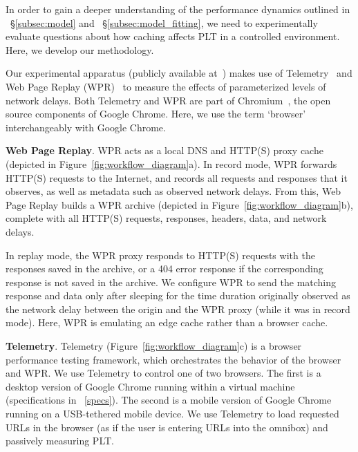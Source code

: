 \label{setup}
In order to gain a deeper understanding of the performance dynamics outlined in ~\S\ref{subsec:model} and ~\S\ref{subsec:model_fitting}, we need to experimentally evaluate questions about how caching affects PLT in a controlled environment.
Here, we develop our methodology.

Our experimental apparatus (publicly available at~\cite{jamshed-telemetry}) makes use of Telemetry~\cite{telemetry} and Web Page Replay (WPR)~\cite{wpr} to measure the effects of parameterized levels of network delays.
Both Telemetry and WPR are part of Chromium~\cite{chromium-source}, the open source components of Google Chrome.
Here, we use the term `browser' interchangeably with Google Chrome.

\textbf{Web Page Replay}. WPR acts as a local DNS and HTTP(S) proxy cache (depicted in Figure~\ref{fig:workflow_diagram}a).
In record mode, WPR forwards HTTP(S) requests to the Internet, and records all requests and responses that it observes, as well as metadata such as observed network delays. From this, Web Page Replay builds a WPR archive (depicted in Figure~\ref{fig:workflow_diagram}b), complete with all HTTP(S) requests, responses, headers, data, and network delays. %

In replay mode, the WPR proxy responds to HTTP(S) requests with the responses saved in the archive, or a 404 error response if the corresponding response is not saved in the archive.
We configure WPR to send the matching response and data only after sleeping for the time duration originally observed as the network delay between the origin and the WPR proxy (while it was in record mode). Here, WPR is emulating an edge cache rather than a browser cache.

\textbf{Telemetry}. Telemetry (Figure~\ref{fig:workflow_diagram}c) is a browser performance testing framework, which orchestrates the behavior of the browser and WPR.
We use Telemetry to control one of two browsers. The first is a desktop version of Google Chrome running within a virtual machine (specifications in ~\ref{specs}). The second is a mobile version of Google Chrome running on a USB-tethered mobile device.
We use Telemetry to load requested URLs in the browser (as if the user is entering URLs into the omnibox) and passively measuring PLT.
